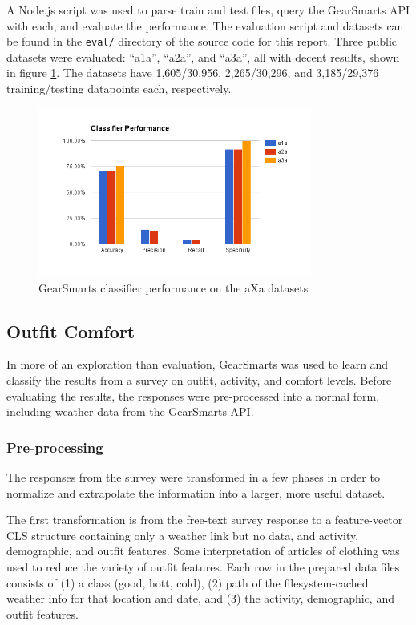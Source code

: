 A Node.js script was used to parse train and test files, query the GearSmarts API with each, and evaluate the performance.
The evaluation script and datasets can be found in the \texttt{eval/} directory of the source code for this report.
Three public datasets were evaluated: ``a1a'', ``a2a'', and ``a3a'', all with decent results, shown in figure \ref{fig:aXa}.
The datasets have 1,605/30,956, 2,265/30,296, and 3,185/29,376 training/testing datapoints each, respectively.

\begin{figure}[ht!]
    \centering
    \includegraphics[width=90mm]{img/aXa.png}
    \caption{GearSmarts classifier performance on the aXa datasets}
    \label{fig:aXa}
\end{figure}



\subsection{Outfit Comfort}
In more of an exploration than evaluation, GearSmarts was used to learn and classify the results from a survey on
outfit, activity, and comfort levels. Before evaluating the results, the responses were pre-processed into a normal
form, including weather data from the GearSmarts API.

\subsubsection{Pre-processing}
\label{subsection:preprocessing}
The responses from the survey were transformed in a few phases in order to normalize and extrapolate the information into a
larger, more useful dataset.

The first transformation is from the free-text survey response to a feature-vector CLS structure
containing only a weather link but no data, and activity, demographic, and outfit features. Some interpretation of articles of clothing
was used to reduce the variety of outfit features. Each row in the prepared data
files consists of (1) a class (good, hott, cold), (2) path of the filesystem-cached weather info for that location and
date, and (3) the activity, demographic, and outfit features.

